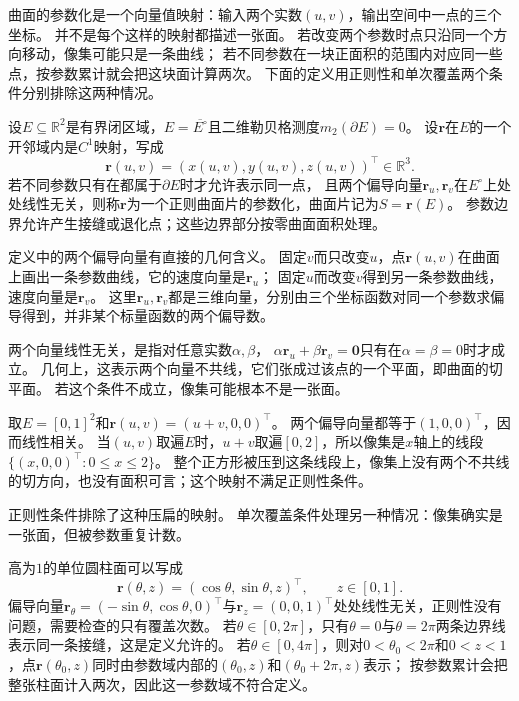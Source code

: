 曲面的参数化是一个向量值映射：输入两个实数$(u,v)$，输出空间中一点的三个坐标。
并不是每个这样的映射都描述一张面。
若改变两个参数时点只沿同一个方向移动，像集可能只是一条曲线；
若不同参数在一块正面积的范围内对应同一些点，按参数累计就会把这块面计算两次。
下面的定义用正则性和单次覆盖两个条件分别排除这两种情况。

\begin{definition}[正则参数曲面片]
\label{def:analysis-regular-surface-patch}
设$E\subseteq\mathbb R^2$是有界闭区域，$E=\overline{E^\circ}$且二维勒贝格测度$m_2(\partial E)=0$。
设$\bm r$在$E$的一个开邻域内是$C^1$映射，写成
\[
 \bm r(u,v)=(x(u,v),y(u,v),z(u,v))^\top\in\mathbb R^3.
\]
若不同参数只有在都属于$\partial E$时才允许表示同一点，
且两个偏导向量$\bm r_u,\bm r_v$在$E^\circ$上处处线性无关，则称$\bm r$为一个正则曲面片的参数化，曲面片记为$S=\bm r(E)$。
参数边界允许产生接缝或退化点；这些边界部分按零曲面面积处理。
\end{definition}

定义中的两个偏导向量有直接的几何含义。
固定$v$而只改变$u$，点$\bm r(u,v)$在曲面上画出一条参数曲线，它的速度向量是$\bm r_u$；
固定$u$而改变$v$得到另一条参数曲线，速度向量是$\bm r_v$。
这里$\bm r_u,\bm r_v$都是三维向量，分别由三个坐标函数对同一个参数求偏导得到，并非某个标量函数的两个偏导数。

两个向量线性无关，是指对任意实数$\alpha,\beta$，
$\alpha\bm r_u+\beta\bm r_v=\bm0$只有在$\alpha=\beta=0$时才成立。
几何上，这表示两个向量不共线，它们张成过该点的一个平面，即曲面的切平面。
若这个条件不成立，像集可能根本不是一张面。

\begin{example}[像集退化为线段的参数映射]
取$E=[0,1]^2$和$\bm r(u,v)=(u+v,0,0)^\top$。
两个偏导向量都等于$(1,0,0)^\top$，因而线性相关。
当$(u,v)$取遍$E$时，$u+v$取遍$[0,2]$，所以像集是$x$轴上的线段$\{(x,0,0)^\top:0\leq x\leq2\}$。
整个正方形被压到这条线段上，像集上没有两个不共线的切方向，也没有面积可言；这个映射不满足正则性条件。
\end{example}

正则性条件排除了这种压扁的映射。
单次覆盖条件处理另一种情况：像集确实是一张面，但被参数重复计数。

\begin{example}[圆柱面的单次覆盖与二重覆盖]
\label{ex:analysis-cylinder-double-cover}
高为$1$的单位圆柱面可以写成
\[
 \bm r(\theta,z)=(\cos\theta,\sin\theta,z)^\top,\qquad z\in[0,1].
\]
偏导向量$\bm r_\theta=(-\sin\theta,\cos\theta,0)^\top$与$\bm r_z=(0,0,1)^\top$处处线性无关，正则性没有问题，需要检查的只有覆盖次数。
若$\theta\in[0,2\pi]$，只有$\theta=0$与$\theta=2\pi$两条边界线表示同一条接缝，这是定义允许的。
若$\theta\in[0,4\pi]$，则对$0<\theta_0<2\pi$和$0<z<1$，点$\bm r(\theta_0,z)$同时由参数域内部的$(\theta_0,z)$和$(\theta_0+2\pi,z)$表示；
按参数累计会把整张柱面计入两次，因此这一参数域不符合定义。
\end{example}

